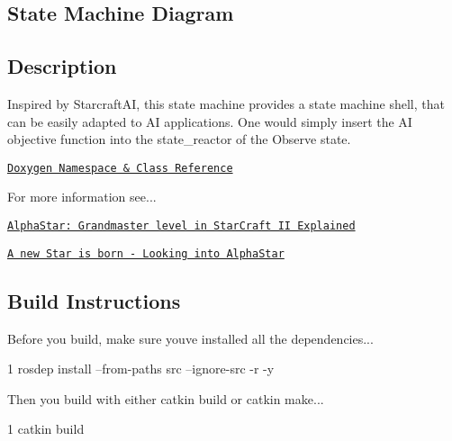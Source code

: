 \subsection*{State Machine Diagram}



\subsection*{Description}

Inspired by Starcraft\+AI, this state machine provides a state machine shell, that can be easily adapted to AI applications. One would simply insert the AI objective function into the state\+\_\+reactor of the Observe state.~\newline


\href{https://reelrbtx.github.io/SMACC_Documentation/master/html/namespacesm__starcraft__ai.html}{\tt Doxygen Namespace \& Class Reference}

For more information see...

\href{https://www.google.com/url?sa=t&rct=j&q=&esrc=s&source=web&cd=10&ved=2ahUKEwiThZKprvvnAhVLvZ4KHbKFDHkQFjAJegQIBxAB&url=https%3A%2F%2Fychai.uk%2Fslides%2F2019-11-12-AlphaStarII.pdf&usg=AOvVaw0jRIVMd3gdb4fM4mmQ4nG1l}{\tt Alpha\+Star\+: Grandmaster level in Star\+Craft II Explained}

\href{https://www.google.com/url?sa=t&rct=j&q=&esrc=s&source=web&cd=1&cad=rja&uact=8&ved=2ahUKEwiqtLHorvvnAhUNs54KHZyOBtMQFjAAegQIBhAB&url=https%3A%2F%2Fhci.iwr.uni-heidelberg.de%2Fsystem%2Ffiles%2Fprivate%2Fdownloads%2F1448422913%2Freport_johannes_daub.pdf&usg=AOvVaw1ZfV12L1svm6sYG7Y2E9Wj}{\tt A new Star is born -\/ Looking into Alpha\+Star}

\subsection*{Build Instructions}

Before you build, make sure you\textquotesingle{}ve installed all the dependencies...


\begin{DoxyCode}
1 rosdep install --from-paths src --ignore-src -r -y 
\end{DoxyCode}


Then you build with either catkin build or catkin make...


\begin{DoxyCode}
1 catkin build
\end{DoxyCode}


